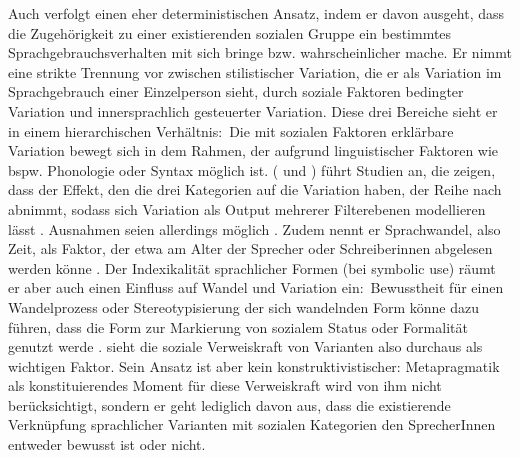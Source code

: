 Auch \citet[47--48, 52]{Preston.1991} verfolgt einen eher deterministischen Ansatz, indem er davon ausgeht, dass die Zugehörigkeit zu einer existierenden sozialen Gruppe ein bestimmtes Sprachgebrauchsverhalten mit sich bringe bzw. wahrscheinlicher mache. 
Er nimmt eine strikte Trennung vor zwischen stilistischer Variation, die er als Variation im Sprachgebrauch einer Einzelperson sieht, durch soziale Faktoren bedingter Variation und innersprachlich gesteuerter Variation. 
Diese drei Bereiche sieht er in einem hierarchischen Verh{\"a}ltnis:~Die mit sozialen Faktoren erkl{\"a}rbare Variation bewegt sich in dem Rahmen, der aufgrund linguistischer Faktoren wie bspw. Phonologie oder Syntax m{\"o}glich ist.
\citeauthor{Preston.1991} (\citeyear[]{Preston.1991} und \citeyear[]{Preston.2005}) f{\"u}hrt Studien an, die zeigen, dass der Effekt, den die drei Kategorien auf die Variation haben, der Reihe nach abnimmt, sodass sich Variation als Output mehrerer Filterebenen modellieren l{\"a}sst \citep[s.][280]{Preston.2005}. 
Ausnahmen seien allerdings m{\"o}glich \citep[s.][38--39]{Preston.1991}. 
Zudem nennt er Sprachwandel, also Zeit, als Faktor, der etwa am Alter der Sprecher oder Schreiberinnen abgelesen werden könne \citep[s.][40]{Preston.1991}. 
Der Indexikalit{\"a}t sprachlicher Formen (bei \citeauthor{Preston.1991} {\glqq}symbolic use{\grqq}) r{\"a}umt er aber auch einen Einfluss auf Wandel und Variation ein:~Bewusstheit f{\"u}r einen Wandelprozess oder Stereotypisierung der sich wandelnden Form k{\"o}nne dazu f{\"u}hren, dass die Form zur Markierung von sozialem Status oder Formalit{\"a}t genutzt werde \citep[s.][42]{Preston.1991}. 
\citet{Preston.1991} sieht die soziale Verweiskraft von Varianten also durchaus als wichtigen Faktor. 
Sein Ansatz ist aber kein konstruktivistischer: Metapragmatik als konstituierendes Moment für diese Verweiskraft wird von ihm nicht berücksichtigt, sondern er geht lediglich davon aus, dass die existierende Verknüpfung sprachlicher Varianten mit sozialen Kategorien den SprecherInnen entweder bewusst ist oder nicht. 

